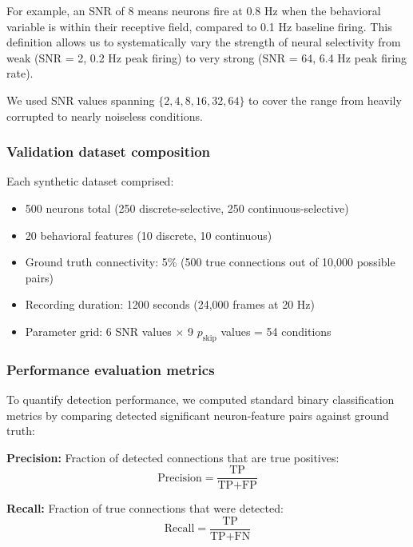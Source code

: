 For example, an SNR of 8 means neurons fire at 0.8 Hz when the behavioral variable
is within their receptive field, compared to 0.1 Hz baseline firing. This definition
allows us to systematically vary the strength of neural selectivity from weak
(SNR = 2, 0.2 Hz peak firing) to very strong (SNR = 64, 6.4 Hz peak firing
rate).

We used SNR values spanning $\{2, 4, 8, 16, 32, 64\}$ to cover the range
from heavily corrupted to nearly noiseless conditions.

\subsubsection{Validation dataset composition}
\label{sec:validation_dataset}

Each synthetic dataset comprised:
\begin{itemize}
\item 500 neurons total (250 discrete-selective, 250 continuous-selective)
\item 20 behavioral features (10 discrete, 10 continuous)
\item Ground truth connectivity: 5\% (500 true connections out of 10,000 possible
pairs)
\item Recording duration: 1200 seconds (24,000 frames at 20 Hz)
\item Parameter grid: 6 SNR values $\times$ 9 $p_{\text{skip}}$ values = 54
conditions
\end{itemize}

\subsubsection{Performance evaluation metrics}
\label{sec:performance_metrics}

To quantify detection performance, we computed standard binary classification
metrics by comparing detected significant neuron-feature pairs against ground truth:

\textbf{Precision:} Fraction of detected connections that are true positives:
\begin{equation}
\label{eq:precision}
\text{Precision} = \frac{\text{TP}}{\text{TP} + \text{FP}}
\end{equation}

\textbf{Recall:} Fraction of true connections that were detected:
\begin{equation}
\label{eq:recall}
\text{Recall} = \frac{\text{TP}}{\text{TP} + \text{FN}}
\end{equation}

